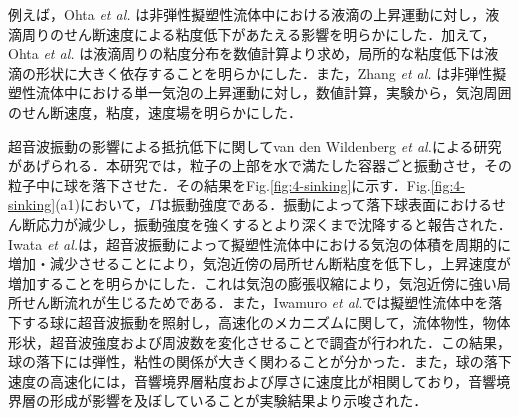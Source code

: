 例えば，Ohta {\it et al.} \cite{ref:2}は非弾性擬塑性流体中における液滴の上昇運動に対し，液滴周りのせん断速度による粘度低下があたえる影響を明らかにした．加えて，Ohta {\it et al.} \cite{ref:3}は液滴周りの粘度分布を数値計算より求め，局所的な粘度低下は液滴の形状に大きく依存することを明らかにした．また，Zhang {\it et al.} \cite{ref:4}は非弾性擬塑性流体中における単一気泡の上昇運動に対し，数値計算，実験から，気泡周囲のせん断速度，粘度，速度場を明らかにした．

超音波振動の影響による抵抗低下に関してvan den Wildenberg {\it et al.}\cite{ref:6}による研究があげられる．本研究では，粒子の上部を水で満たした容器ごと振動させ，その粒子中に球を落下させた．その結果をFig.\ref{fig:4-sinking}に示す．Fig.\ref{fig:4-sinking}(a1)において，$\Gamma$は振動強度である．振動によって落下球表面におけるせん断応力が減少し，振動強度を強くするとより深くまで沈降すると報告された．Iwata {\it et al.}\cite{ref:5}は，超音波振動によって擬塑性流体中における気泡の体積を周期的に増加・減少させることにより，気泡近傍の局所せん断粘度を低下し，上昇速度が増加することを明らかにした．これは気泡の膨張収縮により，気泡近傍に強い局所せん断流れが生じるためである．また，Iwamuro \textit{et al}.\cite{ref:8}では擬塑性流体中を落下する球に超音波振動を照射し，高速化のメカニズムに関して，流体物性，物体形状，超音波強度および周波数を変化させることで調査が行われた．この結果，球の落下には弾性，粘性の関係が大きく関わることが分かった．また，球の落下速度の高速化には，音響境界層粘度および厚さに速度比が相関しており，音響境界層の形成が影響を及ぼしていることが実験結果より示唆された．

